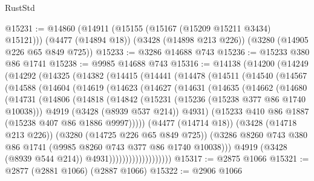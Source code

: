 \begin{lexlean}{RustStd}
\begin{coremodule}
@15231 := @14860
    (@14911 (@15155 (@15167 (@15209 @15211 @3434) @15121)))
    (@4477 (@14894 @18))
    (@3428 (@14898 @213 @226))
    (@3280 (@14905 @226 @65 @849 @725))
@15233 := @3286 @14688 @743
@15236 := @15233 @380 @86 @1741
@15238 := @9985 @14688 @743
@15316 := @14138
    (@14200
      (@14249
        (@14292
          (@14325
            (@14382
              (@14415
                (@14441
                  (@14478
                    (@14511
                      (@14540
                        (@14567
                          (@14588
                            (@14604
                              (@14619
                                (@14623
                                  (@14627
                                    (@14631
                                      (@14635
                                        (@14662
                                          (@14680
                                            (@14731
                                              (@14806
                                                (@14818
                                                  (@14842
                                                    (@15231 (@15236 (@15238 @377 @86 @1740 @10038)))
                                                    @4919
                                                    (@3428 (@8939 @537 @214))
                                                    @4931)
                                                  (@15233
                                                    @410
                                                    @86
                                                    @1887
                                                    (@15238 @407 @86 @1886 @9997)))))
                                            (@4477 (@14714 @18))
                                            (@3428 (@14718 @213 @226))
                                            (@3280 (@14725 @226 @65 @849 @725))
                                            (@3286
                                              @8260
                                              @743
                                              @380
                                              @86
                                              @1741
                                              (@9985 @8260 @743 @377 @86 @1740 @10038)))
                                          @4919
                                          (@3428 (@8939 @544 @214))
                                          @4931)))))))))))))))))))
@15317 := @2875 @1066
@15321 := @2877 (@2881 @1066) (@2887 @1066)
@15322 := @2906 @1066

\end{coremodule}
\end{lexlean}
